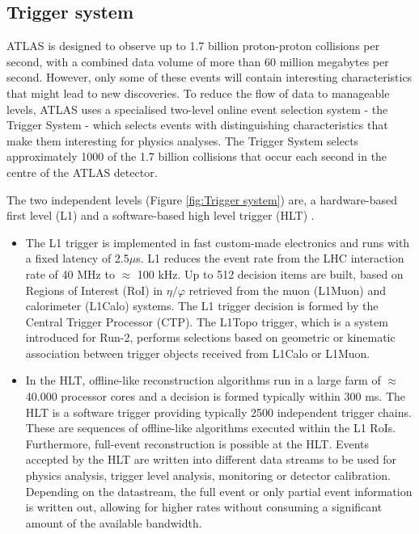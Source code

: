 \documentclass[a4paper, oneside, 11pt, openright]{book}
\begin{document}
				\subsection{Trigger system}
					\cite{Trigger intro}ATLAS is designed to observe up to 1.7 billion proton-proton collisions per second, with a combined data volume of more than 60 million megabytes per second. However, only some of these events will contain interesting characteristics that might lead to new discoveries. To reduce the flow of data to manageable levels, ATLAS uses a specialised two-level online event selection system - the Trigger System - which selects events with distinguishing characteristics that make them interesting for physics analyses. The Trigger System selects approximately 1000 of the 1.7 billion collisions that occur each second in the centre of the ATLAS detector. 
				
					The two independent levels (Figure \ref{fig:Trigger system}) are, a hardware-based first level (L1) and a software-based high level trigger (HLT) \cite{Trigger system}. 
					\begin{itemize}
						\item The L1 trigger is implemented in fast custom-made electronics and runs with a fixed latency of 2.5$\mu$s. L1 reduces the event rate from the LHC interaction rate of 40 MHz to $\approx$ 100 kHz. Up to 512 decision items are built, based on Regions of Interest (RoI) in $\eta/\varphi$ retrieved from the muon (L1Muon) and calorimeter (L1Calo) systems. The L1 trigger decision is formed by the Central Trigger Processor (CTP). The L1Topo trigger, which is a system introduced for Run-2, performs selections based on geometric or kinematic association between trigger objects received from L1Calo or L1Muon. 
						
						\item In the HLT, offline-like reconstruction algorithms run in a large farm of $\approx$ 40.000 processor cores and a decision is formed typically within 300 ms. The HLT is a software trigger providing typically 2500 independent trigger chains. These are sequences of offline-like algorithms executed within the L1 RoIs. Furthermore, full-event reconstruction is possible at the HLT. Events accepted by the HLT are written into different data streams to be used for physics analysis, trigger level analysis, monitoring or detector calibration. Depending on the datastream, the full event or only partial event information is written out, allowing for higher rates without consuming a significant amount of the available bandwidth.
					\end{itemize}
					
\end{document}
